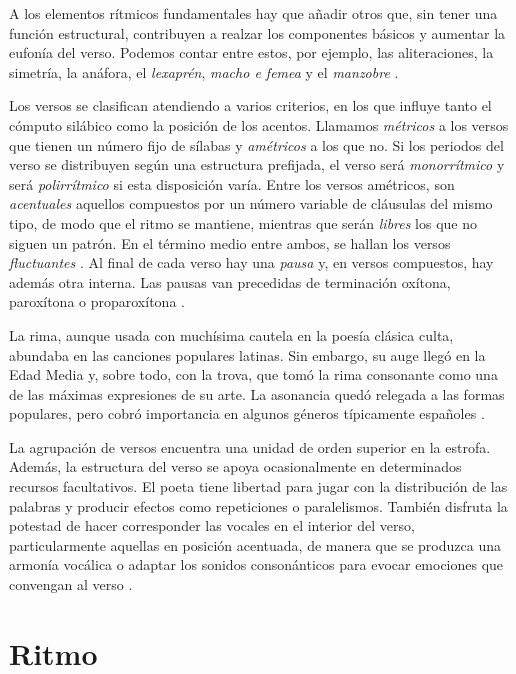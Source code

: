 A los elementos rítmicos fundamentales hay que añadir otros que, sin tener una función estructural, contribuyen a realzar los componentes básicos y aumentar la eufonía del verso. Podemos contar entre estos, por ejemplo, las aliteraciones, la simetría, la anáfora, el \textit{lexaprén}, \textit{macho e femea} y el \textit{manzobre} \parencite[126-129]{dominguez2014a}.

Los versos se clasifican atendiendo a varios criterios, en los que influye tanto el cómputo silábico como la posición de los acentos. Llamamos \textit{métricos} a los versos que tienen un número fijo de sílabas y \textit{amétricos} a los que no. Si los periodos del verso se distribuyen según una estructura prefijada, el verso será \textit{monorrítmico} y  será \textit{polirrítmico} si esta disposición varía. Entre los versos amétricos, son \textit{acentuales} aquellos compuestos por un número variable de cláusulas del mismo tipo, de modo que el ritmo se mantiene, mientras que serán \textit{libres} los que no siguen un patrón. En el término medio entre ambos, se hallan los versos \textit{fluctuantes} \parencite[39]{navarrotomas1991}. Al final de cada verso hay una \textit{pausa} y, en versos compuestos, hay además otra interna. Las pausas van precedidas de terminación oxítona, paroxítona o proparoxítona \parencite[39-40]{navarrotomas1991}.

La rima, aunque usada con muchísima cautela en la poesía clásica culta, abundaba en las canciones populares latinas. Sin embargo, su auge llegó en la Edad Media y, sobre todo, con la trova, que tomó la rima consonante como una de las máximas expresiones de su arte. La asonancia quedó relegada a las formas populares, pero cobró importancia en algunos géneros típicamente españoles \parencite[40-41]{navarrotomas1991}. 

La agrupación de versos encuentra una unidad de orden superior en la estrofa. Además, la estructura del verso se apoya ocasionalmente en determinados recursos facultativos. El poeta tiene libertad para jugar con la distribución de las palabras y producir efectos como repeticiones o paralelismos. También disfruta la potestad de hacer corresponder las vocales en el interior del verso, particularmente aquellas en posición acentuada, de manera que se produzca una armonía vocálica o adaptar los sonidos consonánticos para evocar emociones que convengan al verso \parencite[41-42]{navarrotomas1991}.

\section{Ritmo}

